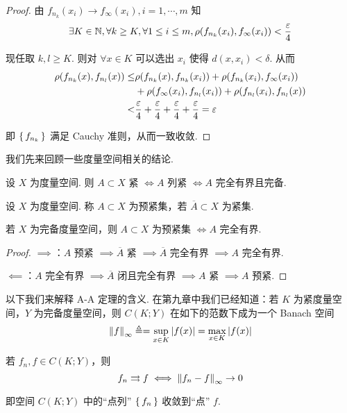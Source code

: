 \begin{proof}
    由 $f_{n_k}(x_i)\to f_\infty(x_i),i=1,\cdots,m$ 知
$$
\exists K\in\mathbb{N},\forall k\ge K,\forall 1\le i\le m,\rho(f_{n_k}(x_i),f_\infty(x_i))<\frac{\varepsilon}{4}
$$

    现任取 $k,l\ge K$. 则对 $\forall x\in K$ 可以选出 $x_i$ 使得 $d(x,x_i)<\delta$. 从而
$$
\begin{aligned}
    \rho(f_{n_k}(x),f_{n_l}(x))\le&\rho(f_{n_k}(x),f_{n_k}(x_i))+\rho(f_{n_k}(x_i),f_\infty(x_i))\\
    &+\rho(f_\infty(x_i),f_{n_l}(x_i))+\rho(f_{n_l}(x_i),f_{n_l}(x))\\
    <&\frac{\varepsilon}{4}+\frac{\varepsilon}{4}+\frac{\varepsilon}{4}+\frac{\varepsilon}{4}=\varepsilon
\end{aligned}
$$

    即 $\set{f_{n_k}}$ 满足 Cauchy 准则，从而一致收敛.
\end{proof}


我们先来回顾一些度量空间相关的结论.

\begin{property}
    设 $X$ 为度量空间. 则 $A\subset X$ 紧 $\iff A$ 列紧 $\iff A$ 完全有界且完备.
\end{property}

\begin{definition}
    设 $X$ 为度量空间. 称 $A\subset X$ 为预紧集，若 $\overline{A}\subset X$ 为紧集. 
\end{definition}

\begin{property}
    若 $X$ 为完备度量空间，则 $A\subset X$ 为预紧集 $\iff A$ 完全有界.
\end{property}
\begin{proof}
    $\implies$：$A$ 预紧 $\implies\overline{A}$ 紧 $\implies\overline{A}$ 完全有界 $\implies A$ 完全有界.

    $\impliedby$：$A$ 完全有界 $\implies\overline{A}$ 闭且完全有界 $\implies A$ 紧 $\implies A$ 预紧.
\end{proof}

以下我们来解释 A-A 定理的含义. 在第九章中我们已经知道：若 $K$ 为紧度量空间，$Y$ 为完备度量空间，则 $C(K;Y)$ 在如下的范数下成为一个 Banach 空间
$$
\left\lVert{f}\right\rVert_\infty\triangleq=\sup_{x\in K}\left\lvert{f(x)}\right\rvert=\max_{x\in K}\left\lvert{f(x)}\right\rvert
$$

若 $f_n,f\in C(K;Y)$，则
$$
f_n\rightrightarrows f\iff\left\lVert{f_n-f}\right\rVert_\infty\to 0
$$

即空间 $C(K;Y)$ 中的“点列” $\set{f_n}$ 收敛到“点” $f$.

